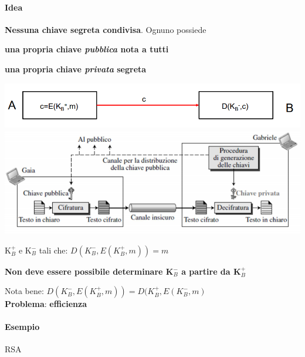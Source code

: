 \documentclass[10pt]{article}
\begin{document}
{\paragraph{Idea} \textbf{Nessuna chiave segreta condivisa}. Ognuno possiede 
\begin{list}{}{}
	\item \textbf{una propria chiave \textit{pubblica} nota a tutti}
	\item \textbf{una propria chiave \textit{privata} segreta}
\end{list}
\begin{center}
	\includegraphics[scale=0.7]{cifrchiaveasimm2.png}\\
	\includegraphics[scale=0.7]{cifrchiaveasimm.png}
\end{center}
\begin{list}{}{\textbf{Requisiti}:}
	\item K$_B^+$ e K$_B^-$ tali che: $D(K_B^-,E(K_B^+, m)) = m$
	\item \textbf{Non deve essere possibile determinare K$_B^-$ a partire da K$_B^+$}
	\item Nota bene: $D(K_B^-,E(K_B^+, m)) = D(K_B^+,E(K_B^-, m)$\\
	\textbf{Problema}: \textbf{efficienza}
\end{list}
\paragraph{Esempio} RSA
\pagebreak
}
\end{document}
